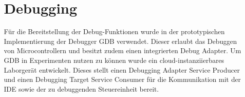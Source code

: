 \section{Debugging}\label{section:prototypische-implementierung:debugging}


Für die Bereitstellung der Debug-Funktionen wurde in der prototypischen Implementierung der Debugger \ac{GDB} \cite{noauthor_gdb_nodate} verwendet. Dieser erlaubt das Debuggen von Microcontrollern und besitzt zudem einen integrierten Debug Adapter. Um \ac{GDB} in Experimenten nutzen zu können wurde ein cloud-instanziierbares Laborgerät entwickelt. Dieses stellt einen Debugging Adapter Service Producer und einen Debugging Target Service Consumer für die Kommunikation mit der IDE sowie der zu debuggenden Steuereinheit bereit.

